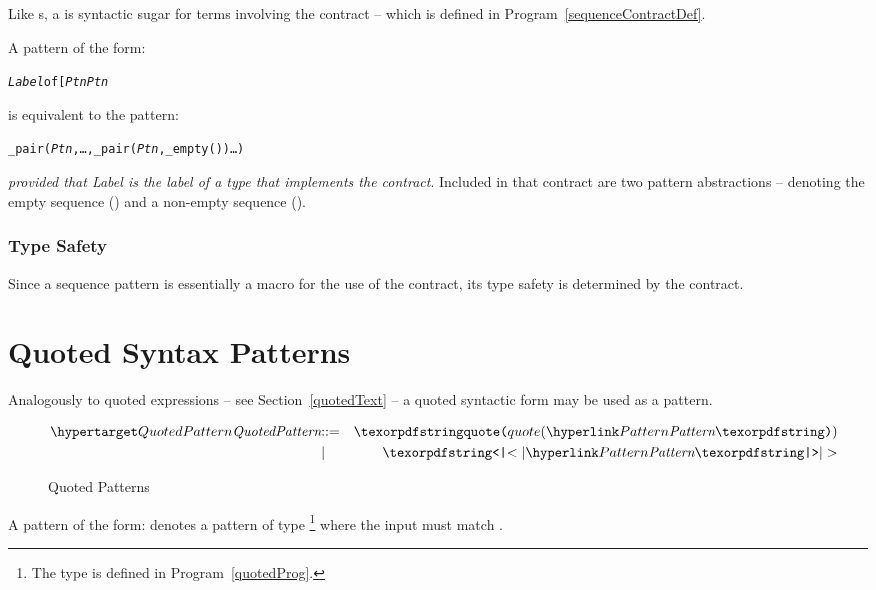 Like s, a  is syntactic sugar for terms involving the  contract -- which is defined in Program~\vref{sequenceContractDef}.

A pattern of the form:
\begin{alltt}
\emph{Label} of [\emph{Ptn}\sequence{;}\emph{Ptn\subn}\q{]}
\end{alltt}
is equivalent to the pattern:
\begin{alltt}
\_pair(\emph{Ptn}, \ldots, \_pair(\emph{Ptn\subn},\_empty())\ldots)
\end{alltt}
\emph{provided that \emph{Label} is the label of a type that implements the  contract}. Included in that contract are two pattern abstractions -- denoting the empty sequence () and a non-empty sequence ().


\subsubsection{Type Safety}
Since a sequence pattern is essentially a macro for the use of the  contract, its type safety is determined by the  contract.

\section{Quoted Syntax Patterns}
\label{quotedPatterns}

Analogously to quoted expressions -- see Section~\vref{quotedText} -- a quoted syntactic form may be used as a pattern.

\begin{figure}[htbp]
\begin{eqnarray*}
\ntDef{QuotedPattern}&\arrow&\q{quote(}\ntRef{Pattern}\q{)}\\
&\choice&\q{<|}\ntRef{Pattern}\q{|>}
\end{eqnarray*}
\caption{Quoted Patterns}
\label{quotedPtnFig}
\end{figure}

A pattern of the form:
denotes a pattern of type \footnote{The  type is defined in Program~\vref{quotedProg}.} where the input must match .

